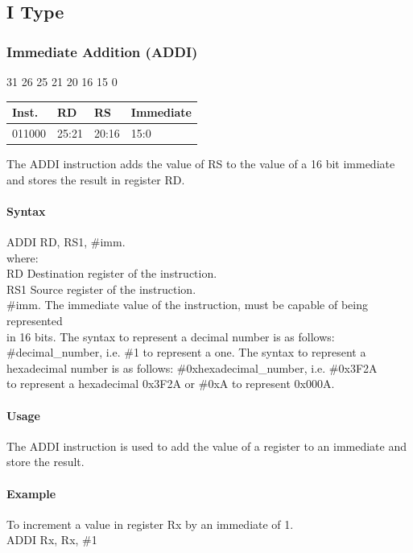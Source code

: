 \documentclass[12pt]{article}
\newcommand{\iTypeInstruction}[6]
{%
    \hspace{1.6cm}31 \hspace{1.15cm}26 \hspace{.05cm}25 \hspace{.8cm}21 \hspace{.05cm}20 \hspace{.8cm}16 \hspace{.05cm}15 \hspace{6.4cm}0
    \vspace{-.25cm}
    \begin{center}
        \begin{tabular}{ |p{1.8cm}|p{1.5cm}|p{1.5cm}|p{6.8cm}| }
            \hline
            \textbf{Inst.} & \textbf{RD} &  \textbf{RS} & \textbf{Immediate}\\
            \hline
            #1 & 25:21 & 20:16 &15:0\\
            \hline
        \end{tabular}
    \end{center}
    
    \noindent
    #2
    
    \paragraph{Syntax}
    \begin{flushleft}
    #3 RD, RS1, \#imm.\\
    \vspace{1em}        %
    where:\\
    \vspace{1em}
    RD  \hspace{3.6em} Destination register of the instruction.\\
    \vspace{1em}
    RS1  \hspace{3.35em} Source register of the instruction.\\
    \vspace{1em}
    \#imm.  \hspace{1.8em} The immediate value of the instruction, must be capable of being represented\\             \hspace{5.4em} in 16 bits. The syntax to represent a decimal number is as follows:\\
            \hspace{5.4em} \#decimal\_number, i.e. \#1 to represent a one. The syntax to represent a\\
            \hspace{5.4em} hexadecimal number is as follows: \#0xhexadecimal\_number, i.e. \#0x3F2A \\
            \hspace{5.4em} to represent a hexadecimal 0x3F2A or \#0xA to represent 0x000A.\\
    \end{flushleft}
    
    \paragraph{Usage}
    \begin{flushleft}
    #4\\
    \end{flushleft}
    \paragraph{Example}
    \begin{flushleft}
    #5\\
    \vspace{1em}
    #6
    \end{flushleft}}
\begin{document}
   
   





\newpage
\subsection{I Type}
    \subsubsection{Immediate Addition (ADDI)}
    
    \iTypeInstruction
    {011000}
    {The ADDI instruction adds the value of RS to the value of a 16 bit immediate and stores the result in register RD.}
    {ADDI}
    {The ADDI instruction is used to add the value of a register to an immediate and store the result.}
    {To increment a value in register Rx by an immediate of 1.}
    {ADDI Rx, Rx, \#1}
    
\end{document}
